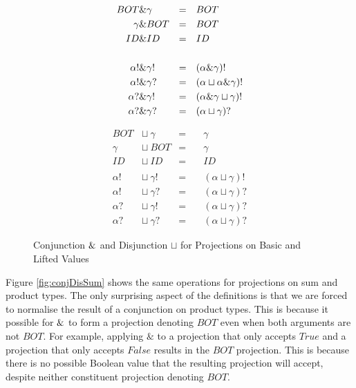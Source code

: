 \begin{figure}
\begin{multicols}{2}
\noindent

\begin{align*}
BOT       &\&  \gamma        &=&\quad BOT \\
\gamma    &\&  BOT           &=&\quad BOT \\
ID        &\&  ID            &=&\quad ID \\
\quad &\             &\ &  \\
\alpha!        &\&  \gamma!  &=&\quad (\alpha \& \gamma)! \\
\alpha!        &\&  \gamma?  &=&\quad (\alpha \sqcup \alpha \& \gamma)! \\
\alpha?        &\&  \gamma!  &=&\quad (\alpha \& \gamma \sqcup \gamma)! \\
\alpha?        &\&  \gamma?  &=&\quad (\alpha \sqcup \gamma)?
\end{align*}%

\begin{align*}
BOT            &\sqcup\  \gamma   &=&\quad \gamma \\
\gamma         &\sqcup\  BOT      &=&\quad \gamma \\
ID             &\sqcup\  ID       &=&\quad ID \\
\quad \ \quad  &                  &\ & \\
\alpha!        &\sqcup\  \gamma!  &=&\quad (\alpha \sqcup \gamma)! \\
\alpha!        &\sqcup\  \gamma?  &=&\quad (\alpha \sqcup \gamma)? \\
\alpha?        &\sqcup\  \gamma!  &=&\quad (\alpha \sqcup \gamma)? \\
\alpha?        &\sqcup\  \gamma?  &=&\quad (\alpha \sqcup \gamma)?
\end{align*}
\end{multicols}
\caption[Conjunction and Disjunction for Projections 1]{Conjunction $\&$ and Disjunction $\sqcup$ for Projections on Basic and Lifted Values}
\label{fig:conjDisBasic}
\end{figure}

Figure \ref{fig:conjDisSum} shows the same operations for projections on sum
and product types. The only surprising aspect of the definitions is that we are
forced to normalise the result of a conjunction on product types. This is
because it possible for $\&$ to form a projection denoting $BOT$ even when
both arguments are not $BOT$. For example, applying $\&$ to a projection that
only accepts $True$ and a projection that only accepts $False$ results in the
$BOT$ projection. This is because there is no possible Boolean value that the
resulting projection will accept, despite neither constituent projection
denoting $BOT$.

